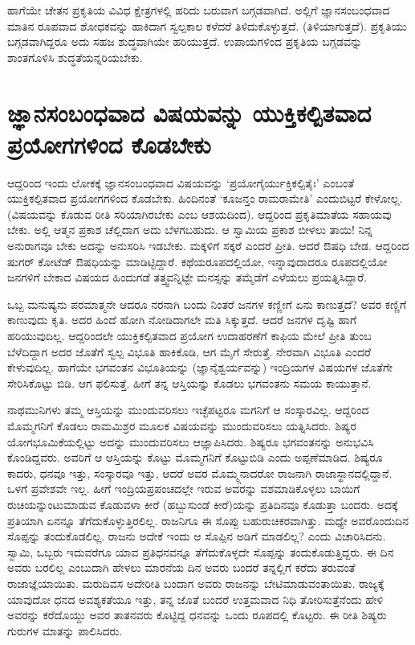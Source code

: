 ಹಾಗೆಯೇ ಚೇತನ ಪ್ರಕೃತಿಯ ವಿವಿಧ ಕ್ಷೇತ್ರಗಳಲ್ಲಿ ಹರಿದು ಬರುವಾಗ ಬಗ್ಗಡವಾಗಿದೆ. ಅಲ್ಲಿಗೆ ಜ್ಞಾನಸಂಬಂಧವಾದ ಮಾತಿನ ರೂಪವಾದ ಶೋಧಕವನ್ನು ಹಾಕಿದಾಗ ಸ್ವಲ್ಪಕಾಲ ಕಳೆದರೆ ತಿಳಿದುಕೊಳ್ಳುತ್ತದೆ. (ತಿಳಿಯಾಗುತ್ತದೆ). ಪ್ರಕೃತಿಯು ಬಗ್ಗಡವಾಗಿದ್ದರೂ ಅದು ಸಹಜ ಶುದ್ಧವಾಗಿಯೇ ಹರಿಯುತ್ತದೆ. ಉಪಾಯಗಳಿಂದ ಪ್ರಕೃತಿಯ ಬಗ್ಗಡವನ್ನು ಶಾಂತಗೊಳಿಸಿ ಶುದ್ಧತೆಯನ್ನರಿಯಬೇಕು.

\section*{ಜ್ಞಾನಸಂಬಂಧವಾದ ವಿಷಯವನ್ನು ಯುಕ್ತಿಕಲ್ಪಿತವಾದ ಪ್ರಯೋಗಗಳಿಂದ ಕೊಡಬೇಕು}

ಆದ್ದರಿಂದ ಇಂದು ಲೋಕಕ್ಕೆ ಜ್ಞಾನಸಂಬಂಧವಾದ ವಿಷಯವನ್ನು `ಪ್ರಯೋಗೈರ್ಯುಕ್ತಿಕಲ್ಪಿತೈಃ'\label{136a} ಎಂಬಂತೆ ಯುಕ್ತಿಕಲ್ಪಿತವಾದ ಪ್ರಯೋಗಗಳಿಂದ ಕೊಡಬೇಕು. ಹಿಂದಿನಂತೆ `ಕೂಜನ್ತಂ ರಾಮರಾಮೇತಿ'\label{136} ಎಂದುಬಿಟ್ಟರೆ ಕೇಳೋಲ್ಲ. (ವಿಷಯವನ್ನು ಕೊಡುವ ರೀತಿ ಸರಿಯಾಗಿರಬೇಕು ಎಂಬ ಆಶಯದಿಂದ). ಆದ್ದರಿಂದ ಪ್ರಕೃತಿಮಾತೆಯ ಸಹಾಯವು ಬೇಕು. ಅಲ್ಲಿ ಆತ್ಮನ ಪ್ರಕಾಶ ಚೆಲ್ಲಿದಾಗ ಅದು ಬೆಳಗಬಹುದು. ಆ ಸ್ವಾಮಿಯ ಪ್ರಕಾಶ ಬೀಳಲು ತಾಯಿ! ನಿನ್ನ ಅನುರಾಗವೂ ಬೇಕು ಅದನ್ನು ಅನುಸರಿಸಿ ಇಡಬೇಕು. ಮಕ್ಕಳಿಗೆ ಸಕ್ಕರೆ ಎಂದರೆ ಪ್ರೀತಿ. ಆದರೆ ಔಷಧಿ ಬೇಡ. ಆದ್ದರಿಂದ ಷುಗರ್ ಕೋಟೆಡ್ ಔಷಧಿಯನ್ನು ಮಾಡಿಟ್ಟಿದ್ದಾರೆ. ಕಥೆಯರೂಪದಲ್ಲಿಯೋ, ಇನ್ನಾವುದಾದರೂ ರೂಪದಲ್ಲಿಯೋ ಜನಗಳಿಗೆ ಬೇಕಾದ ವಿಷಯದ ಹಿಂದುಗಡೆ ತತ್ತ್ವವನ್ನಿಟ್ಟೇ ಮನಸ್ಸನ್ನು ತಮ್ಮೆಡೆಗೆ ಎಳೆಯಲು ಪ್ರಯತ್ನಿಸಿದ್ದಾರೆ.

ಒಬ್ಬ ಮನುಷ್ಯನು ಪರಮಾತ್ಮನೇ ಆದರೂ ನರನಾಗಿ ಬಂದು ನಿಂತರೆ ಜನಗಳ ಕಣ್ಣೀಗೆ ಏನು ಕಾಣುತ್ತದೆ? ಅವರ ಕಣ್ಣಿಗೆ ಕಾಣುವುದು ಕೃತಿ. ಅದರ ಹಿಂದೆ ಹೋಗಿ ನೋಡಿದಾಗಲೇ ಮತಿ ಸಿಕ್ಕುತ್ತದೆ. ಆದರೆ ಜನಗಳ ದೃಷ್ಟಿ ಹಾಗೆ ಹರಿಯುವುದಿಲ್ಲ. ಆದ್ದರಿಂದಲೇ ಯುಕ್ತಿಕಲ್ಪಿತವಾದ ಪ್ರಯೋಗ ಉದಾಹರಣೆಗೆ ಕಾಫಿಯ ಮೇಲೆ ಪ್ರೀತಿ ತುಂಬ ಬೆಳೆದಿದ್ದಾಗ ಅದರ ಜೊತೆಗೆ ಸ್ವಲ್ಪ ವಿಭೂತಿ ಹಾಕಿಕೊಡಿ, ಆಗ ಮೈಗೆ ಸೇರುತ್ತೆ. ನೇರವಾಗಿ ವಿಭೂತಿ ಎಂದರೆ ಕೇಳುವುದಿಲ್ಲ. ಹಾಗೆಯೇ ಭಗವಂತನ ವಿಭೂತಿಯನ್ನು (ಜ್ಞಾನೈಶ್ವರ್ಯವನ್ನು) ಇಂದ್ರಿಯಗಳ ವಿಷಯಗಳ ಜೊತೆಗೇ ಸೇರಿಸಿಕೊಟ್ಟು ಬಿಡಿ. ಆಗ ಫಲಿಸುತ್ತೆ. ಹೀಗೆ ತನ್ನ ಆಸ್ತಿಯನ್ನು ಕೊಡಲು ಭಗವಂತನು ಸಮಯ ಕಾಯುತ್ತಾನೆ.

ನಾಥಮುನಿಗಳು ತಮ್ಮ ಆಸ್ತಿಯನ್ನು ಮುಂದುವರಿಸಲು ಇಚ್ಛೆಪಟ್ಟರೂ ಮಗನಿಗೆ ಆ ಸಂಸ್ಕಾರವಿಲ್ಲ. ಆದ್ದರಿಂದ ಮೊಮ್ಮಗನಿಗೆ ಕೊಡಲು ರಾಮಮಿಶ್ರರ ಮೂಲಕ ವಿಷಯವನ್ನು ಮುಂದುವರಿಸಲು ಯತ್ನಿಸಿದರು. ಶಿಷ್ಯರ ಯೋಗಭೂಮಿಕೆಯಲ್ಲಿಟ್ಟು ಅದನ್ನು ಮುಂದುವರಿಸಲು ಆಜ್ಞಾಪಿಸಿದರು. ಶಿಷ್ಯರೂ ಭಗವಂತನನ್ನು ಅನುಭವಿಸಿ ಕೊಂಡಿದ್ದವರು. ಅವರಿಗೆ ಆ ಆಸ್ತಿಯನ್ನು ಕೊಟ್ಟು ಮೊಮ್ಮಗನಿಗೆ ಕೊಟ್ಟುಬಿಡಿ ಎಂದು ಅಪ್ಪಣೆಮಾಡಿದ. ಶಿಷ್ಯರೂ ಕಾದರು, ಧನವೂ ಇತ್ತು, ಸಂಸ್ಕಾರವೂ ಇತ್ತು, ಆದರೆ ಅವರ ಮೊಮ್ಮ್ಗನಾದರೋ ರಾಜನಾಗಿ ರಾಜಾಸ್ಥಾನದಲ್ಲಿದ್ದಾನೆ. ಒಳಗೆ ಪ್ರವೇಶವೇ ಇಲ್ಲ. ಹೀಗೆ ಇಂದ್ರಿಯಪ್ರಪಂಚದಲ್ಲೇ ಇರುವ ಅವರನ್ನು ವಶಮಾಡಿಕೊಳ್ಳಲು ಬಾಯಿಗೆ ರುಚಿಯನ್ನುಂಟುಮಾಡುವ ಕೊಡುವಳಾ ಕೀರೆ (ಹಬ್ಬುಸುಂಡೆ ಕೀರೆ)ಯನ್ನು ಪ್ರತಿದಿನವೂ ಕೊಡುತ್ತಾ ಬಂದರು. ಅದಕ್ಕೆ ಪ್ರತಿಯಾಗಿ ಏನನ್ನೂ ತೆಗೆದುಕೊಳ್ಳುತ್ತಿರಲಿಲ್ಲ. ರಾಜನಿಗೂ ಈ ಸೊಪ್ಪು ಬಹುರುಚಿಕರವಾಗಿತ್ತು. ಮಧ್ಯೇ ಅವರೊಂದುದಿನ ಸೊಪ್ಪನ್ನು ತಂದುಕೊಡಲಿಲ್ಲ. ರಾಜನು ಅದೇಕೆ ಇಂದು ಆ ಸೊಪ್ಪಿನ ಅಡಿಗೆ ಮಾಡಲಿಲ್ಲ? ಎಂದು ವಿಚಾರಿಸಿದನು. ಸ್ವಾಮಿ, ಒಬ್ಬರು ಇದುವರೆಗೂ ಯಾವ ಪ್ರತಿಧನವನ್ನೂ ತೆಗೆದುಕೊಳ್ಳದೇ ಸೊಪ್ಪನ್ನು ತಂದುಕೊಡುತ್ತಿದ್ದರು. ಈ ದಿನ ಅವರು ಬರಲಿಲ್ಲ ಎಂಬುದಾಗಿ ಹೇಳಲು ಮಾರನೆಯ ದಿನ ಅವರು ಬಂದರೆ ತನ್ನಲ್ಲಿಗೆ ಕರೆದು ತರುವಂತೆ ರಾಜಾಜ್ಞೆಯಾಯಿತು. ಮರುದಿವಸ ಅದೇರೀತಿ ಬಂದಾಗ ಅವರು ರಾಜನನ್ನು ಬೇಟಿಮಾಡುವಂತಾಯಿತು. ರಾಜ್ಯಕ್ಕೆ  ಯಾವುದೋ ಧನದ ಅವಶ್ಯಕತೆಯೂ ಇತ್ತು, ತನ್ನ ಜೊತೆ ಬಂದರೆ ಉತ್ತಮವಾದ ನಿಧಿ ತೋರಿಸುತ್ತೆನೆಂದು ಹೇಳಿ ಅವರನ್ನು ಕರೆದೊಯ್ದು ಅವರ ತಾತನವರು ಕೊಟ್ಟಿದ್ದ ಧನವನ್ನು ಒಂದು ರೂಪದಲ್ಲಿ ಕೊಟ್ಟರು. ಈ ರೀತಿ ಶಿಷ್ಯರು ಗುರುಗಳ ಮಾತನ್ನು ಪಾಲಿಸಿದರು.

